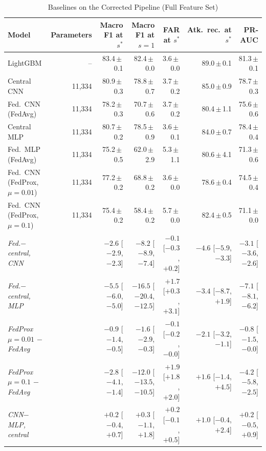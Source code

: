 \begin{table}[t]
\centering
\scriptsize
\caption{Baselines on the Corrected Pipeline (Full Feature Set)}
\label{tab:baselines}
\setlength{\tabcolsep}{3pt}
\begin{tabular}{lrrrrrr}
\toprule
Model & Parameters & Macro F1 at $s^{*}$ & Macro F1 at $s=1$ & FAR at $s^{*}$ & Atk.\ rec.\ at $s^{*}$ & PR-AUC \\
\midrule
LightGBM & -- & 83.4{\,}$\pm${\,}0.1 & 82.4{\,}$\pm${\,}0.0 & 3.6{\,}$\pm${\,}0.0 & 89.0{\,}$\pm${\,}0.1 & 81.3{\,}$\pm${\,}0.1 \\
Central CNN & 11{,}334 & 80.9{\,}$\pm${\,}0.3 & 78.8{\,}$\pm${\,}0.7 & 3.7{\,}$\pm${\,}0.2 & 85.0{\,}$\pm${\,}0.9 & 78.7{\,}$\pm${\,}0.3 \\
Fed.\ CNN (FedAvg) & 11{,}334 & 78.2{\,}$\pm${\,}0.3 & 70.7{\,}$\pm${\,}0.6 & 3.7{\,}$\pm${\,}0.2 & 80.4{\,}$\pm${\,}1.1 & 75.6{\,}$\pm${\,}0.6 \\
Central MLP & 11{,}334 & 80.7{\,}$\pm${\,}0.2 & 78.5{\,}$\pm${\,}0.9 & 3.6{\,}$\pm${\,}0.1 & 84.0{\,}$\pm${\,}0.7 & 78.4{\,}$\pm${\,}0.4 \\
Fed.\ MLP (FedAvg) & 11{,}334 & 75.2{\,}$\pm${\,}0.5 & 62.0{\,}$\pm${\,}2.9 & 5.3{\,}$\pm${\,}1.1 & 80.6{\,}$\pm${\,}4.1 & 71.3{\,}$\pm${\,}0.6 \\
Fed.\ CNN (FedProx, $\mu=0.01$) & 11{,}334 & 77.2{\,}$\pm${\,}0.2 & 68.8{\,}$\pm${\,}0.2 & 3.6{\,}$\pm${\,}0.0 & 78.6{\,}$\pm${\,}0.4 & 74.5{\,}$\pm${\,}0.4 \\
Fed.\ CNN (FedProx, $\mu=0.1$) & 11{,}334 & 75.4{\,}$\pm${\,}0.2 & 58.4{\,}$\pm${\,}0.2 & 5.7{\,}$\pm${\,}0.0 & 82.4{\,}$\pm${\,}0.5 & 71.1{\,}$\pm${\,}0.0 \\
\midrule
\emph{Fed.$-$central, CNN} & & $-2.6$ [$-2.9$, $-2.3$] & $-8.2$ [$-8.9$, $-7.4$] & $-0.1$ [$-0.3$, $+0.2$] & $-4.6$ [$-5.9$, $-3.3$] & $-3.1$ [$-3.6$, $-2.6$] \\
\emph{Fed.$-$central, MLP} & & $-5.5$ [$-6.0$, $-5.0$] & $-16.5$ [$-20.4$, $-12.5$] & $+1.7$ [$+0.3$, $+3.1$] & $-3.4$ [$-8.7$, $+1.9$] & $-7.1$ [$-8.1$, $-6.2$] \\
\emph{FedProx $\mu=0.01$ $-$ FedAvg} & & $-0.9$ [$-1.4$, $-0.5$] & $-1.6$ [$-2.9$, $-0.3$] & $-0.1$ [$-0.2$, $-0.0$] & $-2.1$ [$-3.2$, $-1.1$] & $-0.8$ [$-1.5$, $-0.0$] \\
\emph{FedProx $\mu=0.1$ $-$ FedAvg} & & $-2.8$ [$-4.1$, $-1.4$] & $-12.0$ [$-13.5$, $-10.5$] & $+1.9$ [$+1.8$, $+2.0$] & $+1.6$ [$-1.4$, $+4.5$] & $-4.2$ [$-5.8$, $-2.5$] \\
\emph{CNN$-$MLP, central} & & $+0.2$ [$-0.4$, $+0.7$] & $+0.3$ [$-1.1$, $+1.8$] & $+0.2$ [$-0.1$, $+0.5$] & $+1.0$ [$-0.4$, $+2.4$] & $+0.2$ [$-0.5$, $+0.9$] \\

\end{tabular}
\end{table}
